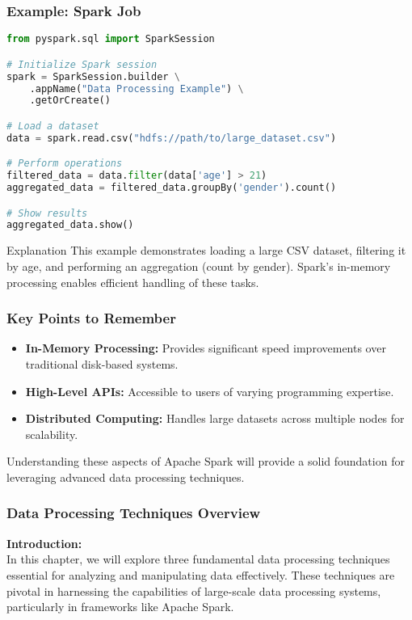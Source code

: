 \documentclass[aspectratio=169]{beamer}
\begin{document}
\begin{frame}[fragile]
  \frametitle{Example: Spark Job}
  \begin{lstlisting}[language=Python]
from pyspark.sql import SparkSession

# Initialize Spark session
spark = SparkSession.builder \
    .appName("Data Processing Example") \
    .getOrCreate()

# Load a dataset
data = spark.read.csv("hdfs://path/to/large_dataset.csv")

# Perform operations
filtered_data = data.filter(data['age'] > 21)
aggregated_data = filtered_data.groupBy('gender').count()

# Show results
aggregated_data.show()
  \end{lstlisting}
  \begin{block}{Explanation}
    This example demonstrates loading a large CSV dataset, filtering it by age, and performing an aggregation (count by gender). Spark's in-memory processing enables efficient handling of these tasks.
  \end{block}
\end{frame}

\begin{frame}[fragile]
  \frametitle{Key Points to Remember}
  \begin{itemize}
    \item \textbf{In-Memory Processing:} Provides significant speed improvements over traditional disk-based systems.
    \item \textbf{High-Level APIs:} Accessible to users of varying programming expertise.
    \item \textbf{Distributed Computing:} Handles large datasets across multiple nodes for scalability.
  \end{itemize}
  Understanding these aspects of Apache Spark will provide a solid foundation for leveraging advanced data processing techniques.
\end{frame}

\begin{frame}[fragile]
    \frametitle{Data Processing Techniques Overview}
    \textbf{Introduction:} \\
    In this chapter, we will explore three fundamental data processing techniques essential for analyzing and manipulating data effectively. These techniques are pivotal in harnessing the capabilities of large-scale data processing systems, particularly in frameworks like Apache Spark.
\end{frame}
\end{document}
